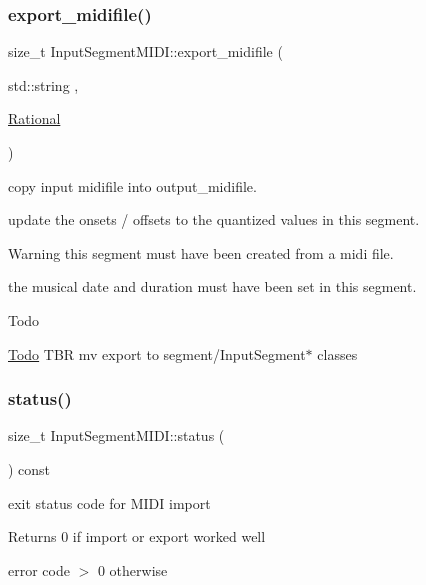 \subsubsection{\texorpdfstring{export\_midifile()}{export\_midifile()}\hspace{0.1cm}{\footnotesize\ttfamily [1/2]}}
{\footnotesize\ttfamily size\+\_\+t Input\+Segment\+M\+I\+D\+I\+::export\+\_\+midifile (\begin{DoxyParamCaption}\item[{std\+::string}]{,  }\item[{\mbox{\hyperlink{classRational}{Rational}}}]{ }\end{DoxyParamCaption})}



copy input midifile into output\+\_\+midifile. 

update the onsets / offsets to the quantized values in this segment. \begin{DoxyWarning}{Warning}
this segment must have been created from a midi file. 

the musical date and duration must have been set in this segment.
\end{DoxyWarning}
\begin{DoxyRefDesc}{Todo}
\item[\mbox{\hyperlink{todo__todo000003}{Todo}}]T\+BR mv export to segment/\+Input\+Segment$\ast$ classes \end{DoxyRefDesc}
\mbox{\label{classInputSegmentMIDI_a647bb0ebc71484c531c13ded3a86839c}} 
\subsubsection{\texorpdfstring{status()}{status()}}
{\footnotesize\ttfamily size\+\_\+t Input\+Segment\+M\+I\+D\+I\+::status (\begin{DoxyParamCaption}{ }\end{DoxyParamCaption}) const\hspace{0.3cm}{\ttfamily [inline]}}



exit status code for M\+I\+DI import 

\begin{DoxyReturn}{Returns}
0 if import or export worked well 

error code $>$ 0 otherwise 
\end{DoxyReturn}
\mbox{\label{classInputSegmentMIDI_a6c0b140ef054db3d0669ffbb11c8c29b}} 
